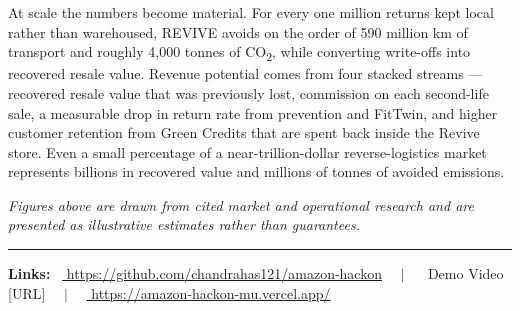 \documentclass[11pt]{article}
\newcommand{\placeholder}[1]{{\color{placeGray} #1}}
\begin{document}
\placeholder{At scale the numbers become material. For every one million returns kept local rather than warehoused, REVIVE avoids on the order of 590 million km of transport and roughly 4,000 tonnes of CO\textsubscript{2}, while converting write-offs into recovered resale value. Revenue potential comes from four stacked streams --- recovered resale value that was previously lost, commission on each second-life sale, a measurable drop in return rate from prevention and FitTwin, and higher customer retention from Green Credits that are spent back inside the Revive store. Even a small percentage of a near-trillion-dollar reverse-logistics market represents billions in recovered value and millions of tonnes of avoided emissions.}

\vspace{8pt}
{\small\color{tipGray}\itshape Figures above are drawn from cited market and operational research and are presented as illustrative estimates rather than guarantees.}

\vspace{18pt}
{\color{amznSlate}\rule{\textwidth}{0.8pt}}

\vspace{6pt}
{\bfseries Links:} \ \href{https://github.com/chandrahas121/amazon-hackon}{\color{amznSlate} https://github.com/chandrahas121/amazon-hackon} \ \ $|$ \ \ \placeholder{Demo Video [URL]} \ \ $|$ \ \ \href{https://amazon-hackon-mu.vercel.app/}{\color{amznSlate} https://amazon-hackon-mu.vercel.app/}
\end{document}
